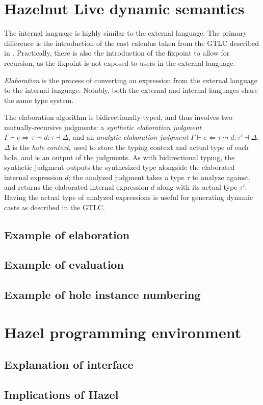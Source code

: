 \section{Hazelnut Live dynamic semantics}
\label{sec:dynamics}


The internal language is highly similar to the external language. The primary difference is the introduction of the cast calculus taken from the GTLC described in . Practically, there is also the introduction of the fixpoint to allow for recursion, as the fixpoint is not exposed to users in the external language.

\textit{Elaboration} is the process of converting an expression from the external language to the internal language. Notably, both the external and internal languages share the same type system.

The elaboration algorithm is bidirectionally-typed, and thus involves two mutually-recursive judgments: a \textit{synthetic elaboration judgment} $\Gamma\vdash e\Rightarrow\tau\leadsto d:\tau\dashv\Delta$, and an \textit{analytic elaboration judgment} $\Gamma\vdash e\Leftarrow\tau\leadsto d:\tau'\dashv\Delta$. $\Delta$ is the \textit{hole context}, used to store the typing context and actual type of each hole, and is an output of the judgments. As with bidirectional typing, the synthetic judgment outputs the synthesized type alongside the elaborated internal expression $d$; the analyzed judgment takes a type $\tau$ to analyze against, and returns the elaborated internal expression $d$ along with its actual type $\tau'$. Having the actual type of analyzed expressions is useful for generating dynamic casts as described in the GTLC.

\subsection{Example of elaboration}
\label{sec:elaboration_example}

\subsection{Example of evaluation}
\label{sec:evaluation_example}

\subsection{Example of hole instance numbering}
\label{sec:hole_instance_example}

\section{Hazel programming environment}
\label{sec:hazel_online}

\subsection{Explanation of interface}
\label{sec:hazel_interface}

\subsection{Implications of Hazel}
\label{sec:hazel_implications}

